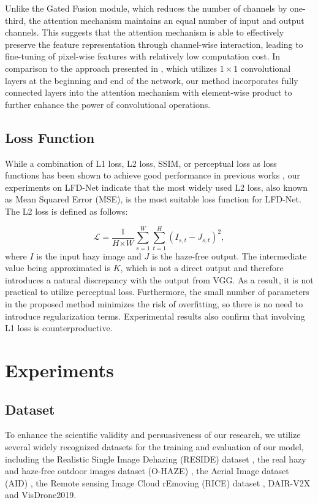 \documentclass[lettersize,journal]{IEEEtran}
\begin{document}
Unlike the Gated Fusion module, which reduces the number of channels by one-third, the attention mechanism maintains an equal number of input and output channels. This suggests that the attention mechanism is able to effectively preserve the feature representation through channel-wise interaction, leading to fine-tuning of pixel-wise features with relatively low computation cost. In comparison to the approach presented in \cite{ullah2021light}, which utilizes $1 \times 1$ convolutional layers at the beginning and end of the network, our method incorporates fully connected layers into the attention mechanism with element-wise product to further enhance the power of convolutional operations.

\subsection{Loss Function}
While a combination of L1 loss, L2 loss, SSIM, or perceptual loss as loss functions has been shown to achieve good performance in previous works \cite{zhao2016loss, lim2017enhanced, rad2019srobb, guo2020joint}, our experiments on LFD-Net indicate that the most widely used L2 loss, also known as Mean Squared Error (MSE), is the most suitable loss function for LFD-Net. The L2 loss is defined as follows:

\begin{equation}
    \mathcal{L} = \frac{1}{\textit{H} \times \textit{W}} \sum_{s=1}^\textit{W} \sum_{t=1}^{\textit{H}} (I_{s,t} - J_{s,t})^2,
\end{equation}
where $I$ is the input hazy image and $J$ is the haze-free output. The intermediate value being approximated is $K$, which is not a direct output and therefore introduces a natural discrepancy with the output from VGG. As a result, it is not practical to utilize perceptual loss. Furthermore, the small number of parameters in the proposed method minimizes the risk of overfitting, so there is no need to introduce regularization terms. Experimental results also confirm that involving L1 loss is counterproductive.

\section{Experiments}
\subsection{Dataset}
To enhance the scientific validity and persuasiveness of our research, we utilize several widely recognized datasets for the training and evaluation of our model, including the Realistic Single Image Dehazing (RESIDE) dataset \cite{li2018reside}, the real hazy and haze-free outdoor images dataset (O-HAZE) \cite{ancuti2018ohaze}, the Aerial Image dataset (AID) \cite{xia2017aid}, the Remote sensing Image Cloud rEmoving (RICE) dataset \cite{lin2019rice}, DAIR-V2X \cite{yu2022dair} and VisDrone2019\cite{du2019visdrone}.
\end{document}
